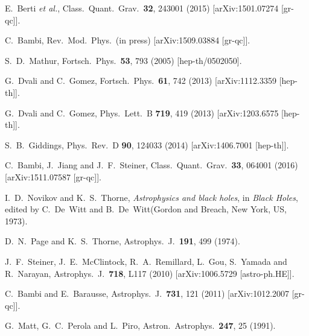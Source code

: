 \documentclass[aps, prd, amsmath, floats, floatfix, twocolumn, nofootinbib, superscriptaddress, showpacs]{revtex4-1}
\begin{document}
\begin{thebibliography}{99}
  E.~Berti {\it et al.},
  Class.\ Quant.\ Grav.\  {\bf 32}, 243001 (2015)
  [arXiv:1501.07274 [gr-qc]].  
  
  C.~Bambi,
  Rev.\ Mod.\ Phys.\  (in press)
  [arXiv:1509.03884 [gr-qc]].  

  S.~D.~Mathur,
  Fortsch.\ Phys.\  {\bf 53}, 793 (2005)
  [hep-th/0502050].

  G.~Dvali and C.~Gomez,
  Fortsch.\ Phys.\  {\bf 61}, 742 (2013)
  [arXiv:1112.3359 [hep-th]].  
  
  G.~Dvali and C.~Gomez,
  Phys.\ Lett.\ B {\bf 719}, 419 (2013)
  [arXiv:1203.6575 [hep-th]].  
  
  S.~B.~Giddings,
  Phys.\ Rev.\ D {\bf 90}, 124033 (2014)
  [arXiv:1406.7001 [hep-th]].  
  
  C.~Bambi, J.~Jiang and J.~F.~Steiner,
  Class.\ Quant.\ Grav.\  {\bf 33}, 064001 (2016)
  [arXiv:1511.07587 [gr-qc]].  
  
  I.~D.~Novikov and K.~S.~Thorne,
  {\it Astrophysics and black holes}, in {\it Black Holes}, edited by C.~De~Witt and B.~De~Witt(Gordon and Breach, New York, US, 1973).

  D.~N.~Page and K.~S.~Thorne,
  Astrophys.\ J.\  {\bf 191}, 499 (1974).  
  
  J.~F.~Steiner, J.~E.~McClintock, R.~A.~Remillard, L.~Gou, S.~Yamada and R.~Narayan,
  Astrophys.\ J.\  {\bf 718}, L117 (2010)
  [arXiv:1006.5729 [astro-ph.HE]].    
  
  C.~Bambi and E.~Barausse,
  Astrophys.\ J.\  {\bf 731}, 121 (2011)
  [arXiv:1012.2007 [gr-qc]].  
  
  G.~Matt, G.~C.~Perola and L.~Piro,
  Astron.\ Astrophys.\  {\bf 247}, 25 (1991).


\end{thebibliography}
\end{document}
